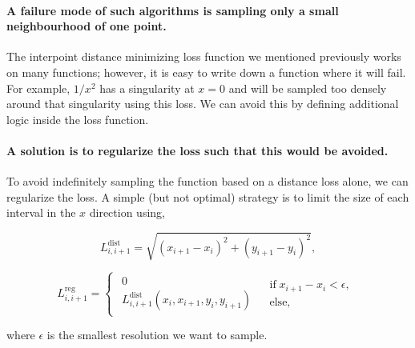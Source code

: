 \hypertarget{a-failure-mode-of-such-algorithms-is-sampling-only-a-small-neighbourhood-of-one-point.}{%
\paragraph{A failure mode of such algorithms is sampling only a small neighbourhood of one point.}\label{a-failure-mode-of-such-algorithms-is-sampling-only-a-small-neighbourhood-of-one-point.}}

The interpoint distance minimizing loss function we mentioned previously works on many functions; however, it is easy to write down a function where it will fail.
For example, $1/x^2$ has a singularity at $x=0$ and will be sampled too densely around that singularity using this loss.
We can avoid this by defining additional logic inside the loss function.

\hypertarget{a-solution-is-to-regularize-the-loss-such-that-this-would-be-avoided.}{%
\paragraph{A solution is to regularize the loss such that this would be avoided.}\label{a-solution-is-to-regularize-the-loss-such-that-this-would-be-avoided.}}

To avoid indefinitely sampling the function based on a distance loss alone, we can regularize the loss.
A simple (but not optimal) strategy is to limit the size of each interval in the $x$ direction using,

\begin{equation*}
L_{i, i+1}^\textrm{dist}=\sqrt{(x_{i+1}-x_{i})^{2}+(y_{i+1}-y_{i})^{2}},
\end{equation*}

\begin{equation*}
L_{i,i+1}^\textrm{reg}=\begin{cases}
\begin{array}{c}
0\\
L_{i, i+1}^\textrm{dist}(x_i, x_{i+1}, y_i, y_{i+1})
\end{array} & \begin{array}{c}
\textrm{if} \; x_{i+1}-x_{i}<\epsilon,\\
\textrm{else,}
\end{array}\end{cases}
\end{equation*}

where $\epsilon$ is the smallest resolution we want to sample.


